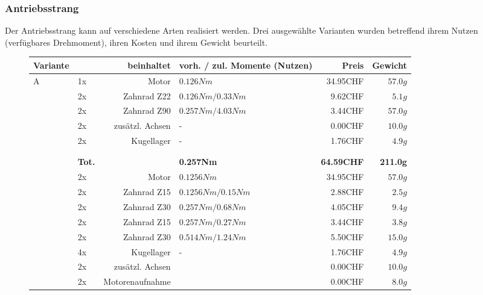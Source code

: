 \subsubsection{Antriebsstrang}
Der Antriebsstrang kann auf verschiedene Arten realisiert werden. Drei ausgewählte Varianten wurden betreffend ihrem Nutzen (verfügbares Drehmoment), ihren Kosten und ihrem Gewicht beurteilt.\\
\begin{figure}[h!]
	\begin{tabular}{p{0.5cm}p{0.8cm}rp{3cm}rr}
		\textbf{Variante} & \multicolumn{2}{r}{\textbf{beinhaltet}} & \textbf{vorh. / zul. Momente (Nutzen)} & \textbf{Preis} & \textbf{Gewicht} \\\hline
		
		\multirow{9}[2]{*}{A}
		& 1x    & Motor           & $0.126 Nm$           & 34.95CHF & $57.0 g$ \\
		& 2x    & Zahnrad Z22     & $0.126 Nm / 0.33 Nm$ &  9.62CHF & $5.1 g$  \\
		& 2x    & Zahnrad Z90     & $0.257 Nm / 4.03 Nm$ &  3.44CHF & $57.0 g$ \\
		& 2x    & zusätzl. Achsen & -                    &  0.00CHF & $10.0 g$ \\
		& 2x    & Kugellager      & -                    &  1.76CHF & $4.9 g$  \\
		&       &                 &                      &          &  \\
		&       &                 &                      &          &  \\
		& \textbf{Tot.} &  & \textbf{0.257Nm} & \textbf{64.59CHF} & \textbf{211.0g} \\
		\multirow{10}[2]{*}{B} 
		& 2x    & Motor           & $0.1256 Nm$          & 34.95CHF & $57.0 g$ \\
		& 2x    & Zahnrad Z15     & $0.1256 Nm / 0.15 Nm$& 2.88CHF  & $2.5 g$  \\
		& 2x    & Zahnrad Z30     & $0.257 Nm / 0.68 Nm$ & 4.05CHF  & $9.4 g$  \\
		& 2x    & Zahnrad Z15     & $0.257 Nm / 0.27 Nm$ & 3.44CHF  & $3.8 g$  \\
		& 2x    & Zahnrad Z30     & $0.514 Nm / 1.24 Nm$ & 5.50CHF  & $15.0 g$ \\
		& 4x    & Kugellager      & -                    & 1.76CHF  & $4.9 g$  \\
		& 2x    & zusätzl. Achsen &                      & 0.00CHF  & $10.0 g$ \\
		& 2x    & Motorenaufnahme &                      & 0.00CHF  & $8.0 g$  \\

\end{tabular}
\end{figure}
